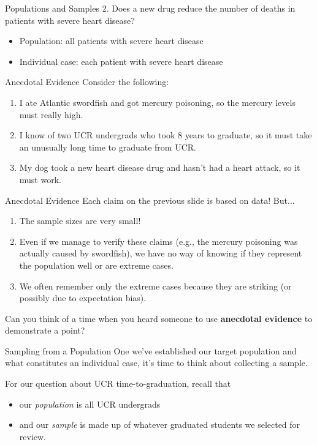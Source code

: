 \begin{frame}{Populations and Samples}
    2. Does a new drug reduce the number of deaths in patients with severe heart disease?
    \begin{itemize}
        \item Population: all patients with severe heart disease
        \item Individual case: each patient with severe heart disease
    \end{itemize}
\end{frame}

\begin{frame}{Anecdotal Evidence}
    Consider the following:
    \begin{enumerate}
        \item I ate Atlantic swordfish and got mercury poisoning, so the mercury levels must really high. 
        \item I know of two UCR undergrads who took 8 years to graduate, so it must take an unusually long time to graduate from UCR.
        \item My dog took a new heart disease drug and hasn't had a heart attack, so it must work.
    \end{enumerate}
\end{frame}

\begin{frame}{Anecdotal Evidence}   
    \vspace{12pt}
    Each claim on the previous slide is based on data! But...
    \begin{enumerate}
        \item The sample sizes are very small!
        \item Even if we manage to verify these claims (e.g., the mercury poisoning was actually caused by swordfish), we have no way of knowing if they represent the population well or are extreme cases.
        \item We often remember only the extreme cases because they are striking (or possibly due to expectation bias).
    \end{enumerate}
    
    \vspace{12pt}
    Can you think of a time when you heard someone to use \textbf{anecdotal evidence} to demonstrate a point?
\end{frame}

\begin{frame}{Sampling from a Population}
    One we've established our target population and what constitutes an individual case, it's time to think about collecting a sample. 
    
    \vspace{12pt}
    For our question about UCR time-to-graduation, recall that
    \begin{itemize}
        \item our \textit{population} is all UCR undergrads
        \item and our \textit{sample} is made up of whatever graduated students we selected for review.
    \end{itemize}
\end{frame}
 
